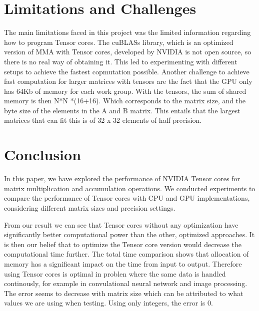 \documentclass[conference]{IEEEtran}
\begin{document}
  \section{Limitations and Challenges}\label{sec:limitations-challenges}
  The main limitations faced in this project was the limited information regarding how to program Tensor cores.
  The cuBLASs library, which is an optimized version of MMA with Tensor cores, developed by NVIDIA is not open source,
  so there is no real way of obtaining it. This led to experimenting with different setups to achieve the fastest copmutation possible.
  Another challenge to achieve fast computation for larger matrices with tensors are the fact that the GPU 
  only has 64Kb of memory for each work group. With the tensors, the sum of shared memory is then N*N *(16+16).
  Which corresponds to the matrix size, and the byte size of the elements in the A and B matrix. This entails that the 
  largest matrices that can fit this is of 32 x 32 elements of half precision.


  \section{Conclusion}\label{sec:conclusion}
  
  In this paper, we have explored the performance of NVIDIA Tensor cores for matrix multiplication and accumulation operations. 
  We conducted experiments to compare the performance of Tensor cores with CPU and GPU implementations, 
  considering different matrix sizes and precision settings.

  From our result we can see that Tensor cores without any optimization have significantly better computational power
  than the other, optimized approaches. It is then our belief that to optimize the Tensor core version would 
  decrease the computational time further. The total time comparison shows that allocation of memory has a significant
  impact on the time from input to output. Therefore using Tensor cores is optimal in problen where the same data is
  handled continously, for example in convulational neural network and image processing. The error seems to decrease
  with matrix size which can be attributed to what values we are using when testing. Using only integers, the error is 0.

  



\end{document}
